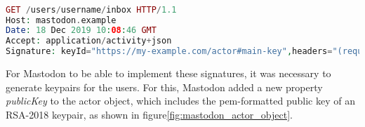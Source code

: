 \lstset{style=JSONStyle}
\begin{lstlisting}[language=PHP, caption=Signed HTTP Request, label=fig:http_signature, float=h]

GET /users/username/inbox HTTP/1.1
Host: mastodon.example
Date: 18 Dec 2019 10:08:46 GMT
Accept: application/activity+json
Signature: keyId="https://my-example.com/actor#main-key",headers="(request-target) host date",signature="Y2FiYW...IxNGRiZDk4ZA=="

\end{lstlisting}

For Mastodon to be able to implement these signatures, it was necessary to generate keypairs for the users. For this, Mastodon added a new property \emph{publicKey} to the actor object, which includes the pem-formatted public key of an RSA-2018 keypair, as shown in figure\ref{fig:mastodon_actor_object}.


